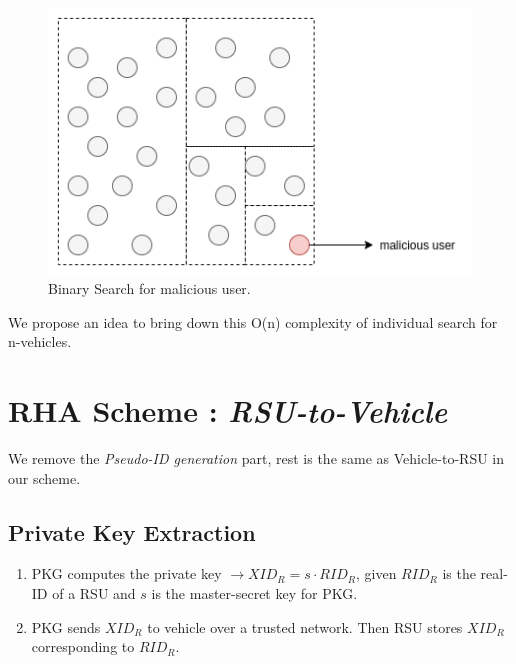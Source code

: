 \documentclass[10pt,journal,letterpaper]{IEEEtran}
\begin{document}
\begin{figure}[h]
    \centering
    \captionsetup{justification=centering}
    \includegraphics[scale=0.4]{binary_grey.png}
    \caption{Binary Search for malicious user.}
    \label{fig:binary_Search}
\end{figure}

We propose an idea to bring down this O(n) complexity of individual search for n-vehicles.\\
%
%

\section{RHA Scheme : \emph{RSU-to-Vehicle}}
We remove the \emph{Pseudo-ID generation} part, rest is the same as
Vehicle-to-RSU in our scheme.


\subsection{Private Key Extraction}
 \begin{enumerate}

     \item PKG computes the private key $\xrightarrow{} XID_R = s \cdot RID_R$, given $RID_R$ is the real-ID of a RSU and $s$ is the master-secret key for PKG.
     \item PKG sends $XID_R$ to vehicle over a trusted network. Then RSU stores $XID_R$ corresponding to $RID_R$.
 \end{enumerate}
\end{document}
